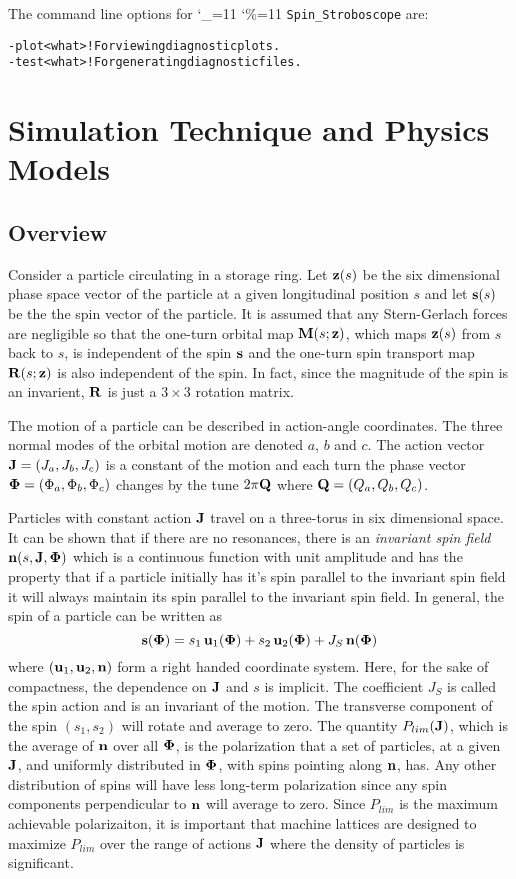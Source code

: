 \documentclass[11pt,openany]{report}
\newcommand{\Bf}[1]{{\bf #1}}
\newcommand{\bfn}{{\Bf n}}
\newcommand{\bfs}{{\Bf s}}
\newcommand{\bfu}{{\Bf u}}
\newcommand{\bfz}{{\Bf z}}
\newcommand{\bfJ}{{\Bf J}}
\newcommand{\bfM}{{\Bf M}}
\newcommand{\bfQ}{{\Bf Q}}
\newcommand{\bfR}{{\Bf R}}
\newcommand{\bfPhi}{{\Bf \Phi}}
\newcommand{\Plim}{P_{lim}}
\newcommand\dottcmd[1]{\texttt{#1}\endgroup}
\newcommand{\vn}{\begingroup\catcode`\_=11 \catcode`\%=11 \dottcmd}
\newcommand{\Begineq}{\begin{equation}}
\newcommand{\Endeq}{\end{equation}}
\newcommand{\sss}{\vn{Spin_Stroboscope}\xspace}
\newlength{\ExBeg}
\newlength{\ExEnd}
\newenvironment{example}
  {\vspace{\ExBeg} \begin{alltt}}
  {\end{alltt} \vspace{\ExEnd}}
\begin{document}
The command line options for \sss are:
\begin{example}
  -plot <what>  ! For viewing diagnostic plots.
  -test <what>  ! For generating diagnostic files.
\end{example}


\chapter{Simulation Technique and Physics Models}
\section{Overview} 

Consider a particle circulating in a storage ring. Let $\bfz(s)$ be the six dimensional
phase space vector of the particle at a given longitudinal position $s$ and let $\bfs(s)$ be the the
spin vector of the particle. It is assumed that any Stern-Gerlach forces are negligible so that the
one-turn orbital map $\bfM(s;\bfz)$, which maps $\bfz(s)$ from $s$ back to $s$, is independent of
the spin $\bfs$ and the one-turn spin transport map $\bfR(s;\bfz)$ is also independent of the spin.
In fact, since the magnitude of the spin is an invarient, $\bfR$ is just a $3 \times 3$ rotation
matrix.

The motion of a particle can be described in action-angle coordinates. The three normal modes of the
orbital motion are denoted $a$, $b$ and $c$. The action vector $\bfJ = (J_a, J_b, J_c)$ is a
constant of the motion and each turn the phase vector $\bfPhi = (\Phi_a, \Phi_b, \Phi_c)$ changes by
the tune $2\pi\bfQ$ where $\bfQ = (Q_a, Q_b, Q_c)$.

Particles with constant action $\bfJ$ travel on a three-torus in six dimensional space. It can be
shown that if there are no resonances, there is an {\em invariant spin field} $\bfn (s,
\bfJ, \bfPhi)$ which is a continuous function with unit amplitude and has the property that if a particle
initially has it's spin parallel to the invariant spin field it will always maintain its spin
parallel to the invariant spin field. In general, the spin of a particle can be written as
\Begineq
  \bfs(\bfPhi) = s_1 \, \bfu_1(\bfPhi) + s_2 \, \bfu_2(\bfPhi) + J_S \, \bfn(\bfPhi)
\Endeq
where $(\bfu_1, \bfu_2, \bfn)$ form a right handed coordinate system. Here, for the sake of
compactness, the dependence on $\bfJ$ and $s$ is implicit. The coefficient $J_S$ is called the spin
action and is an invariant of the motion. The transverse component of the spin $(s_1, s_2)$ will
rotate and average to zero. The quantity $\Plim(\bfJ)$, which is the average of $\bfn$ over all
$\bfPhi$, is the polarization that a set of particles, at a given $\bfJ$, and uniformly distributed
in $\bfPhi$, with spins pointing along $\bfn$, has. Any other distribution of spins will have less
long-term polarization since any spin components perpendicular to $\bfn$ will average to zero. Since 
$\Plim$ is the maximum achievable polarizaiton, it is important that machine lattices are designed
to maximize $\Plim$ over the range of actions $\bfJ$ where the density of particles is significant.
\end{document}
